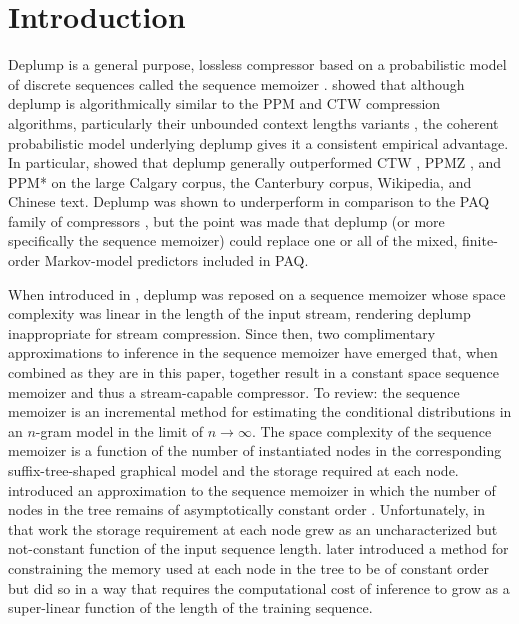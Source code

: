 \section{Introduction}
\label{sec:introduction}

Deplump \citep{Gasthaus2010} is a general purpose, lossless compressor based on a probabilistic model of discrete sequences called the sequence memoizer \citep{Wood2009}.   \citeauthor{Gasthaus2010} showed that although deplump is algorithmically similar to the PPM and CTW compression algorithms, particularly their unbounded context lengths variants \citep{Cleary1997,Willems1998}, the coherent probabilistic model underlying deplump gives it a consistent empirical advantage.  In particular, \citeauthor{Gasthaus2010} showed that deplump generally outperformed CTW  \citep{Willems2009}, PPMZ \citep{Peltola2002}, and PPM* \citep{Cleary1997} on the large Calgary corpus, the Canterbury corpus, Wikipedia, and Chinese text.  Deplump was shown to underperform in comparison to the PAQ family of compressors \citep{Mahoney2005}, but the point was made that deplump (or more specifically the sequence memoizer) could replace one or all of the mixed, finite-order Markov-model predictors included in PAQ.  

When introduced in \citep{Gasthaus2010}, deplump was reposed on a sequence memoizer whose space complexity was linear in the length of the input stream, rendering deplump inappropriate for stream compression.  Since then, two complimentary approximations to inference in the sequence memoizer have emerged that, when combined as they are in this paper, together result in a constant space sequence memoizer and thus a stream-capable compressor. To review: the sequence memoizer is an incremental method for estimating the conditional distributions in an $n$-gram model in the limit of $n\rightarrow\infty$.  The space complexity of the sequence memoizer is a function of the number of instantiated nodes in the corresponding suffix-tree-shaped graphical model and the storage required at each node. \citeauthor{Bartlett2010} introduced an approximation to the sequence memoizer in which the number of nodes in the tree remains of asymptotically constant order \citep{Bartlett2010}.  Unfortunately, in that work the storage requirement at each node grew as an uncharacterized but not-constant function of the input sequence length.  \citeauthor{Gasthaus2011} later introduced a method for constraining the memory used at each node in the tree to be of constant order  \citep{Gasthaus2011} but did so in a way that requires the computational cost of inference to grow as a super-linear function of the length of the training sequence.

